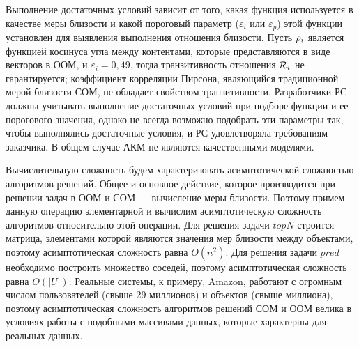 Выполнение достаточных условий зависит от того, какая
функция используется в качестве меры близости и какой пороговый
параметр ($\varepsilon_{i}$ или $\varepsilon_p$) этой функции
установлен для выявления выполнения отношения близости.
Пусть $\mathcal{\rho}_i$ является функцией косинуса угла между контентами, которые
представляются в виде векторов в ООМ, и $\varepsilon_i = 0,49$, тогда
транзитивность отношения $\mathcal{R}_i$ не гарантируется; коэффициент корреляции Пирсона,
являющийся традиционной мерой близости СОМ, не обладает свойством
транзитивности. Разработчики РС должны учитывать выполнение достаточных условий
при подборе функции и ее порогового значения, однако не всегда возможно
подобрать эти параметры так, чтобы выполнялись достаточные условия, и РС
удовлетворяла требованиям заказчика. В общем случае АКМ не являются
качественными моделями.

Вычислительную сложность будем характеризовать асимптотической сложностью
алгоритмов решений. Общее и основное действие, которое производится при
решении задач в ООМ и СОМ
--- вычисление меры близости. Поэтому примем данную операцию элементарной
и вычислим асимптотическую сложность алгоритмов относительно этой операции.
Для решения задачи $topN$ строится матрица, элементами которой являются
значения мер близости между объектами, поэтому
асимптотическая сложность равна $O(n^2)$.
Для решения задачи $pred$ необходимо построить множество соседей,
поэтому асимптотическая сложность равна $O(|U|)$.
Реальные системы, к примеру, Amazon, работают с огромным числом пользователей
(свыше 29 миллионов) и объектов (свыше миллиона), поэтому
асимптотическая сложность алгоритмов решений СОМ и ООМ велика в условиях работы
с подобными массивами данных, которые характерны для реальных данных.
